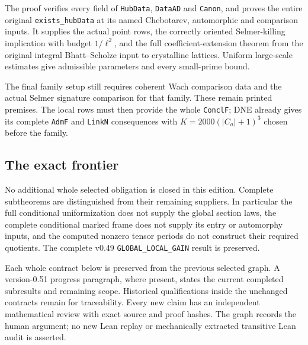 The proof verifies every field of \texttt{HubData}, \texttt{DataAD}
and \texttt{Canon}, and proves the entire original
\texttt{exists\_hubData} at its named Chebotarev, automorphic and
comparison inputs. It supplies the actual point rows, the correctly
oriented Selmer-killing implication with budget $1/\ell^2$, and
the full coefficient-extension theorem from the original integral
Bhatt--Scholze input to crystalline lattices. Uniform large-scale
estimates give admissible parameters and every small-prime bound.

The final family setup still requires coherent Wach comparison
data and the actual Selmer signature comparison for that family.
These remain printed premises. The local rows must then provide
the whole \texttt{ConclF}; DNE already gives its complete
\texttt{AdmF} and \texttt{LinkN} consequences with
$K=2000(|C_a|+1)^3$ chosen before the family.

\subsection{The exact frontier}

No additional whole selected obligation is closed in this edition.
Complete subtheorems are distinguished from their remaining
suppliers. In particular the full conditional uniformization does
not supply the global section laws, the complete conditional
marked frame does not supply its entry or automorphy inputs,
and the computed nonzero tensor periods do not construct their
required quotients. The complete v0.49
\texttt{GLOBAL\_LOCAL\_GAIN} result is preserved.

Each whole contract below is preserved from the previous selected
graph. A version-0.51 progress paragraph, where present, states
the current completed subresults and remaining scope. Historical
qualifications inside the unchanged contracts remain for
traceability. Every new claim has an independent mathematical
review with exact source and proof hashes. The graph records
the human argument; no new Lean replay or mechanically extracted
transitive Lean audit is asserted.

